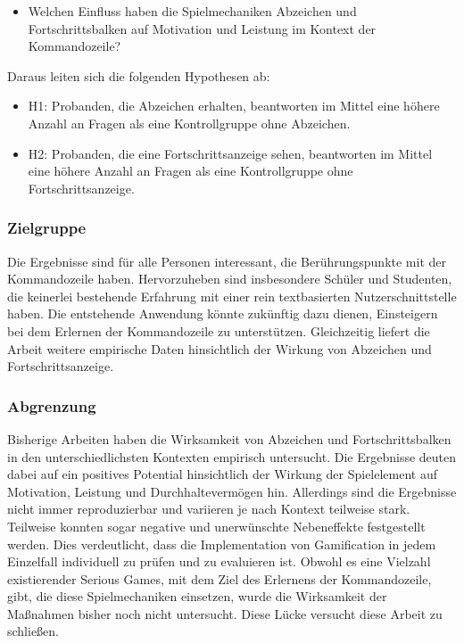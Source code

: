 \begin{itemize}
    \item Welchen Einfluss haben die Spielmechaniken Abzeichen und Fortschrittsbalken auf Motivation und Leistung im Kontext der Kommandozeile?
\end{itemize}

Daraus leiten sich die folgenden Hypothesen ab:

\begin{itemize}
\item H1: Probanden, die Abzeichen erhalten, beantworten im Mittel eine höhere Anzahl an Fragen als eine Kontrollgruppe ohne Abzeichen.
\item H2: Probanden, die eine Fortschrittsanzeige sehen, beantworten im Mittel eine höhere Anzahl an Fragen als eine Kontrollgruppe ohne Fortschrittsanzeige.
\end{itemize}

\subsubsection{Zielgruppe}
Die Ergebnisse sind für alle Personen interessant, die Berührungspunkte mit der Kommandozeile haben.
Hervorzuheben sind insbesondere Schüler und Studenten, die keinerlei bestehende Erfahrung mit einer rein textbasierten Nutzerschnittstelle haben.
Die entstehende Anwendung könnte zukünftig dazu dienen, Einsteigern bei dem Erlernen der Kommandozeile zu unterstützen.
Gleichzeitig liefert die Arbeit weitere empirische Daten hinsichtlich der Wirkung von Abzeichen und Fortschrittsanzeige.

\subsubsection{Abgrenzung}
Bisherige Arbeiten haben die Wirksamkeit von Abzeichen und Fortschrittsbalken in den unterschiedlichsten Kontexten empirisch untersucht.
Die Ergebnisse deuten dabei auf ein positives Potential hinsichtlich der Wirkung der Spielelement auf Motivation, Leistung und Durchhaltevermögen hin. Allerdings sind die Ergebnisse nicht immer reproduzierbar und variieren je nach Kontext teilweise stark. Teilweise konnten sogar negative und unerwünschte Nebeneffekte festgestellt werden. Dies verdeutlicht, dass die Implementation von Gamification in jedem Einzelfall individuell zu prüfen und zu evaluieren ist.
Obwohl es eine Vielzahl existierender Serious Games, mit dem Ziel des Erlernens der Kommandozeile, gibt, die diese Spielmechaniken einsetzen, wurde die Wirksamkeit der Maßnahmen bisher noch nicht untersucht. Diese Lücke versucht diese Arbeit zu schließen.